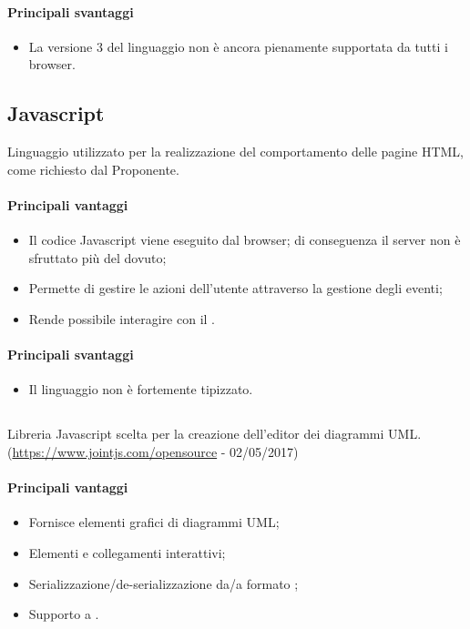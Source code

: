 \documentclass[../PianoDiQualifica.tex]{subfiles}
\begin{document}
			\paragraph{Principali svantaggi}
				\begin{itemize}
					\item La versione 3 del linguaggio non è ancora pienamente supportata da tutti
					i browser. 
				\end{itemize}
		\subsection{Javascript}
			Linguaggio utilizzato per la realizzazione del comportamento delle pagine HTML, come
			richiesto dal Proponente.
			\paragraph{Principali vantaggi}
			\begin{itemize}
					\item Il codice Javascript viene eseguito dal browser; di conseguenza
					il server non è sfruttato più del dovuto;
					\item Permette di gestire le azioni dell'utente attraverso la gestione degli eventi;
					\item Rende possibile interagire con il .
				\end{itemize}
			\paragraph{Principali svantaggi}
				\begin{itemize}
					\item Il linguaggio non è fortemente tipizzato.
				\end{itemize}
		\subsection{}
			Libreria Javascript scelta per la creazione dell'editor dei diagrammi UML.\\
			(\url{https://www.jointjs.com/opensource} - 02/05/2017)
			\paragraph{Principali vantaggi}
			\begin{itemize}
					\item Fornisce elementi grafici di diagrammi UML;
					\item Elementi e collegamenti interattivi;
					\item Serializzazione/de-serializzazione da/a formato ;
					\item Supporto a .
				\end{itemize}
\end{document}
